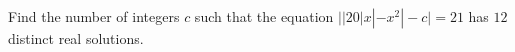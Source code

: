Find the number of integers $c$ such that the equation $\bigl||20|x|-x^2|-c\bigr|=21$ has $12$ distinct real solutions.

